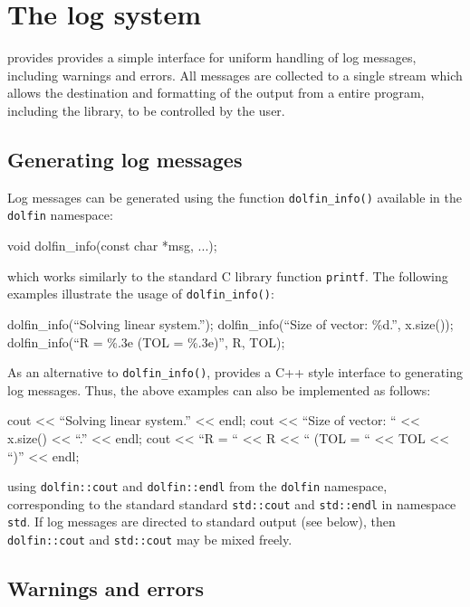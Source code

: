\chapter{The log system}

\dolfin{} provides provides a simple interface for uniform handling of
log messages, including warnings and errors. All messages are
collected to a single stream which allows the destination and
formatting of the output from a entire program, including the
\dolfin{} library, to be controlled by the user.

\section{Generating log messages}

Log messages can be generated using the function
\texttt{dolfin\_info()} available in the \texttt{dolfin} namespace:
\begin{code}
  void dolfin_info(const char *msg, ...);
\end{code}
which works similarly to the standard C library function \texttt{printf}.
The following examples illustrate the usage of
\texttt{dolfin\_info()}:
\begin{code}
  dolfin_info(``Solving linear system.'');
  dolfin_info(``Size of vector: \%d.'', x.size());
  dolfin_info(``R = \%.3e (TOL = \%.3e)'', R, TOL);
\end{code}

As an alternative to \texttt{dolfin\_info()}, \dolfin{} provides a C++
style interface to generating log messages. Thus, the above examples
can also be implemented as follows:
\footnotesize
\begin{code}
  cout << ``Solving linear system.'' << endl;
  cout << ``Size of vector: `` << x.size() << ``.'' << endl;
  cout << ``R = `` << R << `` (TOL = `` << TOL << ``)'' << endl;
\end{code}
\normalsize
using \texttt{dolfin::cout} and \texttt{dolfin::endl} from the \texttt{dolfin}
namespace, corresponding to the standard standard \texttt{std::cout}
and \texttt{std::endl} in namespace \texttt{std}. If log messages are
directed to standard output (see below), then \texttt{dolfin::cout}
and \texttt{std::cout} may be mixed freely.

\section{Warnings and errors}

